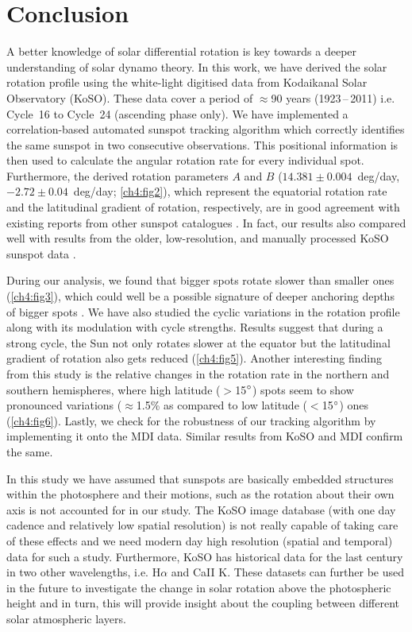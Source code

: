 \section{Conclusion}
\label{ch4-con}

A better knowledge of solar differential rotation is key towards a deeper understanding of solar dynamo theory. In this work, we have derived the solar rotation profile using the white-light digitised data from Kodaikanal Solar Observatory (KoSO). These data cover a period of $\approx$90 years (1923\,--\,2011) i.e. Cycle~16 to Cycle~24 (ascending phase only). We have implemented a correlation-based automated sunspot tracking algorithm which correctly identifies the same sunspot in two consecutive observations. This positional information is then used to calculate the angular rotation rate for every individual spot. Furthermore, the derived rotation parameters $A$ and $B$ ($14.381\pm0.004$~deg/day,~$-2.72\pm0.04$~deg/day; \autoref{ch4:fig2}), which represent the equatorial rotation rate and the latitudinal gradient of rotation, respectively, are in good agreement with existing reports from other sunspot catalogues \citep{Javaraiah2005a, Ribes1993}. In fact, our results also compared well with results from the older, low-resolution, and manually processed KoSO sunspot data \citep{Howard1999, Gupta1999}. 


During our analysis, we found that bigger spots rotate slower than smaller ones (\autoref{ch4:fig3}), which could well be a possible signature of deeper anchoring depths of bigger spots \citep{Balthasar1986}. We have also studied the cyclic variations in the rotation profile along with its modulation with cycle strengths. Results suggest that during a strong cycle, the Sun not only rotates slower at the equator but the latitudinal gradient of rotation also gets reduced (\autoref{ch4:fig5}). Another interesting finding from this study is the relative changes in the rotation rate in the northern and southern hemispheres, where high latitude ($>$15$^\circ$) spots seem to show pronounced variations ($\approx$1.5\% as compared to low latitude ($<$15$^\circ$) ones (\autoref{ch4:fig6}). Lastly, we check for the robustness of our tracking algorithm by implementing it onto the MDI data. Similar results from KoSO and MDI confirm the same.

In this study we have assumed that sunspots are basically embedded structures within the photosphere and their motions, such as the rotation about their own axis \citep{Brown2003,Svanda2009} is not accounted for in our study. The KoSO image database (with one day cadence and relatively low spatial resolution) is not really capable of taking care of these effects and we need modern day high resolution (spatial and temporal) data for such a study.
Furthermore, KoSO has historical data for the last century in two other wavelengths, i.e. H$\alpha$ and CaII K. These datasets can further be used in the future to investigate the change in solar rotation above the photospheric height and in turn, this will provide insight about the coupling between different solar atmospheric layers. 
